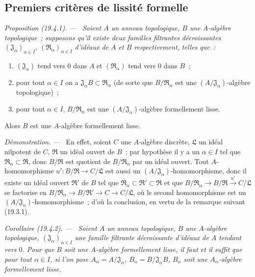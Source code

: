 \documentclass[10pt,oneside]{book}
\makeatletter
\newcommand{\setmanualcurrentlabel}[1]{\def\@currentlabel{#1}}
\newenvironment{proposition}[1][]{%
  \setmanualcurrentlabel{#1}\par\medskip\noindent\itshape Proposition (#1). ---\ }{\par}
\newenvironment{corollary}[1][]{%
  \setmanualcurrentlabel{#1}\par\medskip\noindent\itshape Corollaire (#1). ---\ }{\par}
\newenvironment{proof}{%
  \par\medskip\noindent\textit{Démonstration. ---\ }}{\par}
\makeatother
\begin{document}
\subsection{Premiers critères de lissité formelle}
\label{subsection:0.19.4-fr}

\begin{proposition}[19.4.1]
\label{0.19.4.1-fr}
Soient $A$ un anneau topologique, $B$ une $A$-algèbre topologique~; supposons
qu'il existe deux familles filtrantes décroissantes
$(\mathfrak J_\alpha)_{\alpha\in I}$,
$(\mathfrak R_\alpha)_{\alpha\in I}$ d'idéaux de $A$ et $B$
respectivement, telles que~:
\begin{enumerate}
  \item[$1^\circ$] $(\mathfrak J_\alpha)$ tend vers $0$ dans $A$ et
  $(\mathfrak R_\alpha)$ tend vers $0$ dans $B$~;
  \item[$2^\circ$] pour tout $\alpha\in I$ on a
  $\mathfrak J_\alpha B\subset\mathfrak R_\alpha$ (de sorte que
  $B/\mathfrak R_\alpha$ est une
  $(A/\mathfrak J_\alpha)$-algèbre topologique)~;
  \item[$3^\circ$] pour tout $\alpha\in I$,
  $B/\mathfrak R_\alpha$ est une
  $(A/\mathfrak J_\alpha)$-algèbre formellement lisse.
\end{enumerate}
Alors $B$ est une $A$-algèbre formellement lisse.
\end{proposition}

\begin{proof}
En effet, soient $C$ une $A$-algèbre discrète, $\mathfrak L$ un idéal
nilpotent de $C$, $\mathfrak R$ un idéal ouvert de $B$~; par hypothèse il y a
un $\alpha\in I$ tel que
$\mathfrak R_\alpha\subset\mathfrak R$, donc $B/\mathfrak R$ est
quotient de $B/\mathfrak R_\alpha$ par un idéal ouvert. Tout
$A$-homomorphisme $u':B/\mathfrak R\to C/\mathfrak L$ est aussi un
$(A/\mathfrak J_\alpha)$-homomorphisme, donc il existe un idéal ouvert
$\mathfrak R'$ de $B$ tel que
$\mathfrak R_\alpha\subset\mathfrak R'\subset\mathfrak R$ et que
$B/\mathfrak R_\alpha\to B/\mathfrak R\xrightarrow{u'}C/\mathfrak L$
se factorise en
$B/\mathfrak R_\alpha\to B/\mathfrak R'\to C\to C/\mathfrak L$,
où le second homomorphisme est un
$(A/\mathfrak J_\alpha)$-homomorphisme~; d'où la conclusion, en vertu de
la remarque suivant (19.3.1).
\end{proof}

\begin{corollary}[19.4.2]
\label{0.19.4.2-fr}
Soient $A$ un anneau topologique, $B$ une $A$-algèbre topologique,
$(\mathfrak J_\alpha)_{\alpha\in I}$ une famille filtrante décroissante
d'idéaux de $A$ tendant vers $0$. Pour que $B$ soit une $A$-algèbre
formellement lisse, il faut et il suffit que pour tout $\alpha\in I$, si
l'on pose $A_\alpha=A/\mathfrak J_\alpha$,
$B_\alpha=B/\mathfrak J_\alpha B$, $B_\alpha$ soit une
$A_\alpha$-algèbre formellement lisse.
\end{corollary}
\end{document}
